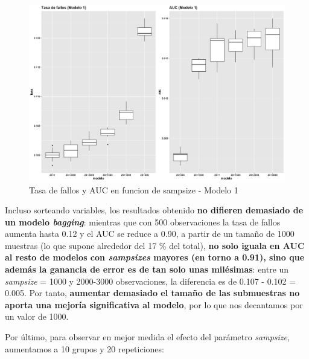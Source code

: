 \documentclass[
]{article}
\begin{document}
\begin{figure}[h!]

{\centering \includegraphics[width=0.99\linewidth,height=0.99\textheight,]{./charts/random_forest/04_comp_tasa_auc_modelo1_sampsizes} 

}

\caption{Tasa de fallos y AUC en funcion de  sampsize - Modelo 1}\label{fig:unnamed-chunk-93}
\end{figure}

Incluso sorteando variables, los resultados obtenido \textbf{no difieren
demasiado de un modelo \emph{bagging}}: mientras que con 500
observaciones la tasa de fallos aumenta hasta 0.12 y el AUC se reduce a
0.90, a partir de un tamaño de 1000 muestras (lo que supone alrededor
del 17 \% del total), \textbf{no solo iguala en AUC al resto de modelos
con \emph{sampsizes} mayores (en torno a 0.91), sino que además la
ganancia de error es de tan solo unas milésimas}: entre un
\emph{sampsize} = 1000 y 2000-3000 observaciones, la diferencia es de
0.107 - 0.102 = 0.005. Por tanto, \textbf{aumentar demasiado el tamaño
de las submuestras no aporta una mejoría significativa al modelo}, por
lo que nos decantamos por un valor de 1000.

Por último, para observar en mejor medida el efecto del parámetro
\emph{sampsize}, aumentamos a 10 grupos y 20 repeticiones:
\end{document}
